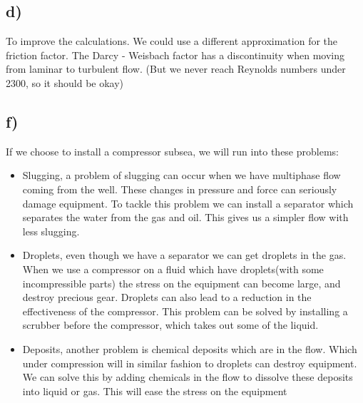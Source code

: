 \documentclass[DIV=calc, paper=a4, fontsize=13pt, twocolumn]{scrartcl}	 %
\begin{document}
\subsection*{d)}
To improve the calculations. We could use a different approximation for the friction factor. The Darcy - Weisbach factor has a discontinuity when moving from laminar to turbulent flow. (But we never reach Reynolds numbers under 2300, so it should be okay)
\subsection*{f)}
If we choose to install a compressor subsea, we will run into these problems:
\begin{itemize}
\item Slugging, a problem of slugging can occur when we have multiphase flow coming from the well. These changes in pressure and force can seriously damage equipment. To tackle this problem we can install a separator which separates the water from the gas and oil. This gives us a simpler flow with less slugging.
\item Droplets, even though we have a separator we can get droplets in the gas. When we use a compressor on a fluid which have droplets(with some incompressible parts) the stress on the equipment can become large, and destroy precious gear. Droplets can also lead to a reduction in the effectiveness of the compressor. This problem can be solved by installing a scrubber before the compressor, which takes out some of the liquid.
\item Deposits, another problem is chemical deposits which are in the flow. Which under compression will in similar fashion to droplets can destroy equipment. We can solve this by adding chemicals in the flow to dissolve these deposits into liquid or gas. This will ease the stress on the equipment
\end{itemize}
\end{document}

